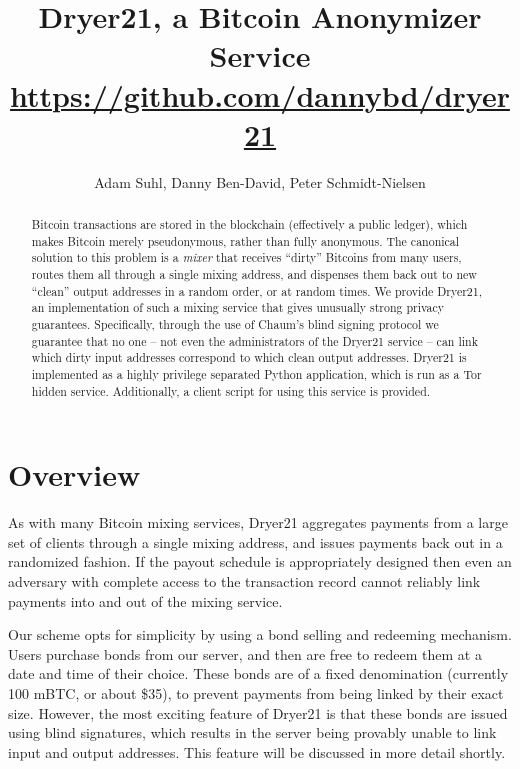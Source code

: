 \documentclass[12pt]{article}
\title{Dryer21, a Bitcoin Anonymizer Service\\\normalsize{\url{https://github.com/dannybd/dryer21}}}
\author{Adam Suhl, Danny Ben-David, Peter Schmidt-Nielsen}
\begin{document}
\maketitle
\begin{abstract}
Bitcoin transactions are stored in the blockchain (effectively a public ledger), which makes Bitcoin merely pseudonymous, rather than fully anonymous.
The canonical solution to this problem is a \emph{mixer} that receives ``dirty'' Bitcoins from many users, routes them all through a single mixing address, and dispenses them back out to new ``clean'' output addresses in a random order, or at random times.
We provide Dryer21, an implementation of such a mixing service that gives unusually strong privacy guarantees.
Specifically, through the use of Chaum's blind signing protocol we guarantee that no one -- not even the administrators of the Dryer21 service -- can link which dirty input addresses correspond to which clean output addresses.
Dryer21 is implemented as a highly privilege separated Python application, which is run as a Tor hidden service.
Additionally, a client script for using this service is provided.
\end{abstract}

\section{Overview}
As with many Bitcoin mixing services, Dryer21 aggregates payments from a large set of clients through a single mixing address, and issues payments back out in a randomized fashion.
If the payout schedule is appropriately designed then even an adversary with complete access to the transaction record cannot reliably link payments into and out of the mixing service.

Our scheme opts for simplicity by using a bond selling and redeeming mechanism.
Users purchase bonds from our server, and then are free to redeem them at a date and time of their choice.
These bonds are of a fixed denomination (currently 100 mBTC, or about \$35), to prevent payments from being linked by their exact size.
However, the most exciting feature of Dryer21 is that these bonds are issued using blind signatures, which results in the server being provably unable to link input and output addresses.
This feature will be discussed in more detail shortly.
\end{document}
